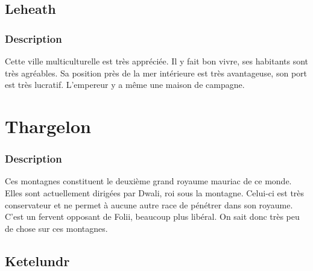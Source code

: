 \subsection{Leheath}
\subsubsection{Description}
\hypertarget {leheath}{}Cette ville multiculturelle est très appréciée.
Il y fait bon vivre, ses habitants sont très agréables.
Sa position près de la mer intérieure est très avantageuse, son port est très lucratif.
L'empereur y a même une maison de campagne.
\section{Thargelon}
\subsubsection{Description}
\hypertarget {thargelon}{}Ces montagnes constituent le deuxième grand royaume mauriac de ce monde. 
Elles sont actuellement dirigées par Dwali, roi sous la montagne.
Celui-ci est très conservateur et ne permet à aucune autre race de pénétrer dans son royaume.
C'est un fervent opposant de Folii, beaucoup plus libéral. 
On sait donc très peu de chose sur ces montagnes.
\subsection{Ketelundr}
